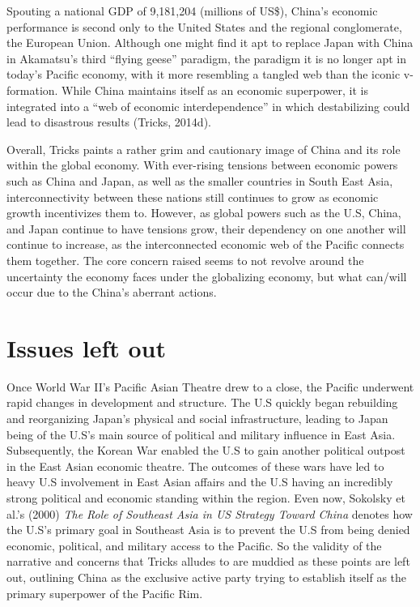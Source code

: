 \documentclass[man,donotrepeattitle,letter]{apa6}
\begin{document}
Spouting a national GDP of 9,181,204 (millions of US\$), China's economic performance is second only to the United States and the regional conglomerate, the European Union. Although one might find it apt to replace Japan with China in Akamatsu's third ``flying geese'' paradigm, the paradigm it is no longer apt in today's Pacific economy, with it more resembling a tangled web than the iconic v-formation. While China maintains itself as an economic superpower, it is integrated into a ``web of economic interdependence'' in which destabilizing could lead to disastrous results (Tricks, 2014d).

Overall, Tricks paints a rather grim and cautionary image of China and its role within the global economy.  With ever-rising tensions between economic powers such as China and Japan, as well as the smaller countries in South East Asia, interconnectivity between these nations still continues to grow as economic growth incentivizes them to.  However, as global powers such as the U.S, China, and Japan continue to have tensions grow, their dependency on one another will continue to increase, as the interconnected economic web of the Pacific connects them together.  The core concern raised seems to not revolve around the uncertainty the economy faces under the globalizing economy, but what can/will occur due to the China's aberrant actions.


\section{Issues left out}
Once World War II's Pacific Asian Theatre drew to a close, the Pacific underwent rapid changes in development and structure. The U.S quickly began rebuilding and reorganizing Japan's physical and social infrastructure, leading to Japan being of the U.S's main source of political and military influence in East Asia. Subsequently, the Korean War enabled the U.S to gain another political outpost in the East Asian economic theatre.  The outcomes of these wars have led to heavy U.S involvement in East Asian affairs and the U.S having an incredibly strong political and economic standing within the region. Even now, Sokolsky et al.'s (2000) \textit{The Role of Southeast Asia in US Strategy Toward China} denotes how the U.S's primary goal in Southeast Asia is to prevent the U.S from being denied economic, political, and military access to the Pacific.  So the validity of the narrative and concerns that Tricks alludes to are muddied as these points are left out, outlining China as the exclusive active party trying to establish itself as the primary superpower of the Pacific Rim.
\end{document}
